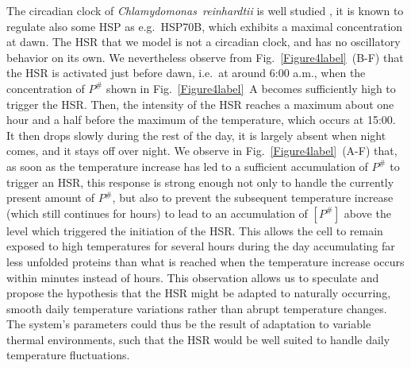 \documentclass[oneside, 10pt, a4paper, twocolumn]{article}
\begin{document}
The circadian clock of \emph{Chlamydomonas~reinhardtii} is well studied \cite{Mittag2005,Jacobshagen2001}, 
it is known to regulate also some HSP as e.g.~HSP70B, which exhibits a maximal concentration at dawn. 
The HSR that we model is not a circadian clock, and has no oscillatory behavior on its own{. We nevertheless observe from Fig.~\ref{Figure4label}~(B-F) that the HSR is activated just before dawn, i.e.~at around 6:00 a.m., when the concentration of $P^\#$ shown in Fig.~\ref{Figure4label}~A becomes sufficiently high to trigger the HSR. Then, the intensity of the HSR reaches a maximum about one hour and a half before the maximum of the temperature, which occurs at 15:00. 
It then drops slowly during the rest of the day, it is largely absent when night comes, and it stays off over night. We observe in Fig.~\ref{Figure4label}~(A-F) that, as soon as the temperature increase has led to a sufficient accumulation of $P^\#$ to trigger an HSR, this response is strong enough not only to handle the currently present amount of $P^\#$, but also to prevent the subsequent temperature increase (which still continues for hours) to lead to an accumulation of $\left[ P^\# \right]$ above the level which triggered the initiation of the HSR. This allows the cell to remain exposed to high temperatures for several hours during the day 
accumulating far less unfolded proteins than what is reached when the temperature increase occurs within minutes instead of hours.
This observation allows us to speculate and propose the hypothesis that the HSR might be adapted to naturally occurring,
smooth daily temperature variations rather than abrupt temperature changes. The system's parameters could thus be the result of adaptation to variable thermal environments, such that the HSR would be well suited to handle daily temperature fluctuations.}

\end{document}
